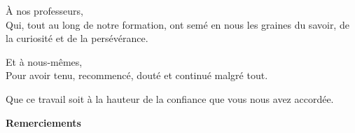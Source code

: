 \documentclass[12pt,a4paper,oneside]{report}
\begin{document}
\begin{center}
\vspace{0.6cm}

À nos professeurs,\\
Qui, tout au long de notre formation, ont semé en nous les graines du savoir, de la curiosité et de la persévérance.

\vspace{0.6cm}

Et à nous-mêmes,\\
Pour avoir tenu, recommencé, douté et continué malgré tout.

\vspace{0.6cm}

Que ce travail soit à la hauteur de la confiance que vous nous avez accordée.

\end{center}


\clearpage
\thispagestyle{empty}

\vspace*{1cm}

\begin{center}
{\bfseries\fontsize{16}{18}\selectfont Remerciements}
\end{center}

\vspace{1cm}
\end{document}
